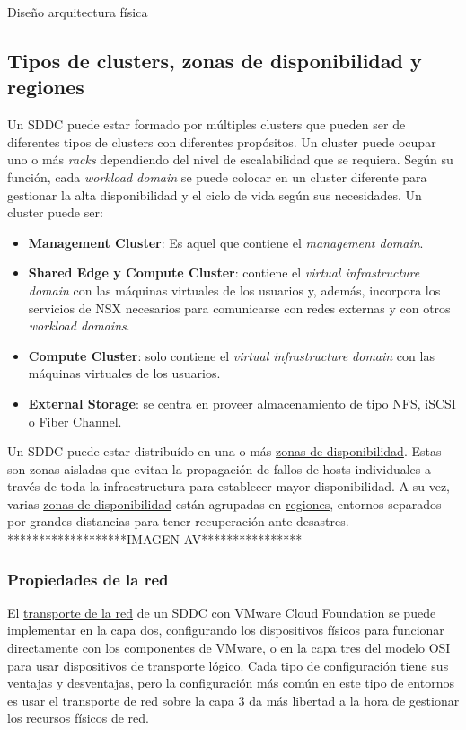 \begin{subsection}{Diseño arquitectura física}

\subsection{Tipos de clusters, zonas de disponibilidad y regiones}
Un SDDC puede estar formado por múltiples clusters que pueden ser de diferentes tipos de clusters con diferentes propósitos. Un cluster puede ocupar uno o más \textit{racks} dependiendo del nivel de escalabilidad que se requiera. Según su función, cada \textit{workload domain} se puede colocar en un cluster diferente para gestionar la alta disponibilidad y el ciclo de vida según sus necesidades. Un cluster puede ser:
\begin{itemize}
    \item \textbf{Management Cluster}: Es aquel que contiene el \textit{management domain}.
    \item \textbf{Shared Edge y Compute Cluster}: contiene el \textit{virtual infrastructure domain} con las máquinas virtuales de los usuarios y, además, incorpora los servicios de NSX necesarios para comunicarse con redes externas y con otros \textit{workload domains}.
    \item \textbf{Compute Cluster}: solo contiene el \textit{virtual infrastructure domain} con las máquinas virtuales de los usuarios.
    \item \textbf{External Storage}: se centra en proveer almacenamiento de tipo NFS, iSCSI o Fiber Channel.
\end{itemize}

Un SDDC puede estar distribuído en una o más \underline{zonas de disponibilidad}. Estas son zonas aisladas que evitan la propagación de fallos de hosts individuales a través de toda la infraestructura para establecer mayor disponibilidad. A su vez, varias \underline{zonas de disponibilidad} están agrupadas en \underline{regiones}, entornos separados por grandes distancias para tener recuperación ante desastres.\\
*******************IMAGEN AV****************\\

\subsubsection{Propiedades de la red}
El \underline{transporte de la red} de un SDDC con VMware Cloud Foundation se puede implementar en la capa dos, configurando los dispositivos físicos para funcionar directamente con los componentes de VMware, o en la capa tres del modelo OSI para usar dispositivos de transporte lógico. Cada tipo de configuración tiene sus ventajas y desventajas, pero la configuración más común en este tipo de entornos es usar el transporte de red sobre la capa 3 da más libertad a la hora de gestionar los recursos físicos de red.\\



\end{subsection}
